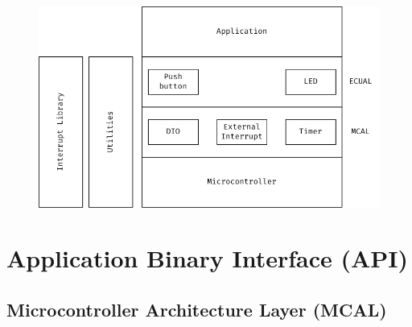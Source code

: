 \documentclass[10pt]{article}
\begin{document}
\begin{figure}[H]
	\includegraphics[width=14cm]{layered-arhictecture_v_3_0}
	\centering
\end{figure}

\section{Application Binary Interface (API)}
\subsection{Microcontroller Architecture Layer (MCAL)}
\end{document}
